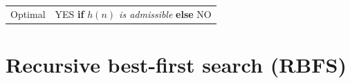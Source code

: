 \begin{customTableWrapper}{1.2}
\begin{longtable}{p{3cm} p{6cm}}





    Optimal & YES \textbf{if} \textit{$h(n)$ is admissible} \textbf{else} NO \\



\end{longtable}
\end{customTableWrapper}




\section{Recursive best-first search (RBFS) \cite{aci-1}} \label{Recursive best-first search (RBFS)}




